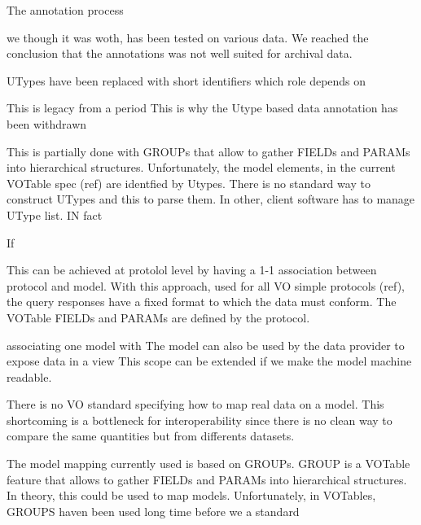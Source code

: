 \documentclass[11pt,a4paper]{ivoa}
\begin{document}
\iffalse
 The annotation process 

we though it was woth, has been tested on various data. We reached the conclusion that the annotations was not well suited for archival data.

 

 UTypes have been replaced with short identifiers which role depends on 


This is legacy from a period 
This is why the Utype based data annotation has been withdrawn

This is partially done with GROUPs that allow to gather FIELDs and PARAMs into hierarchical structures. Unfortunately, the model elements, in the current VOTable spec (ref) are identfied by Utypes. There is no standard way to construct UTypes and this to parse them. In other, client software has to manage UType list. IN fact 

If  


This can be achieved at protolol level by having a 1-1 association between protocol and  model. With this approach, used for all VO simple protocols (ref), the query responses have a fixed format to which the data must conform. The VOTable FIELDs and PARAMs are defined by the protocol.


associating one model with
The model can also be used by the data provider to expose data in a view
This scope can be extended if we make the model machine readable.


There is no VO standard specifying how to map real data on a model. 
This shortcoming is a bottleneck for interoperability since there is no clean way to compare the same quantities but from differents datasets. 


The model mapping currently used is based on GROUPs. GROUP is a VOTable feature that allows to gather FIELDs and PARAMs into hierarchical structures. In theory, this could be used to map models. Unfortunately, in VOTables, GROUPS haven been used long time before we a standard  
\end{document}
